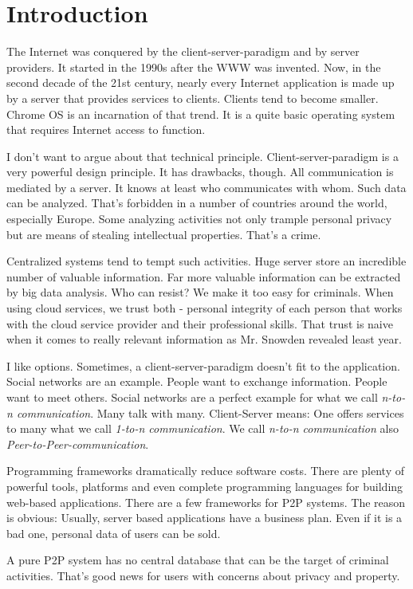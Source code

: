 \chapter{Introduction}
The Internet was conquered by the client-server-paradigm and by server providers. It started in the 1990s after the WWW was invented. Now, in the second decade of the 21st century, nearly every Internet application is made up by a server that provides services to clients. Clients tend to become smaller. Chrome OS is an incarnation of that trend. It is a quite basic operating system that requires Internet access to function.

I don't want to argue about that technical principle. Client-server-paradigm is a very powerful design principle. It has drawbacks, though. All communication is mediated by a server. It knows at least who communicates with whom. Such data can be analyzed. That's forbidden in a number of countries around the world, especially Europe. Some analyzing activities not only trample personal privacy but are means of stealing intellectual properties. That's a crime.

Centralized systems tend to tempt such activities. Huge server store an incredible number of valuable information. Far more valuable information can be extracted by big data analysis. Who can resist? We make it too easy for criminals. When using cloud services, we trust both - personal integrity of each person that works with the cloud service provider and their professional skills. That trust is naive when it comes to really relevant information as Mr. Snowden revealed least year.

I like options. Sometimes, a client-server-paradigm doesn't fit to the application. Social networks are an example. People want to exchange information. People want to meet others. Social networks are a perfect example for what we call {\it n-to-n communication}. Many talk with many. Client-Server means: One offers services to many what we call {\it 1-to-n communication}.
We call {\it n-to-n communication} also {\it Peer-to-Peer-communication}.

Programming frameworks dramatically reduce software costs. There are plenty of powerful tools, platforms and even complete programming languages for building web-based applications. There are a few frameworks for P2P systems. The reason is obvious: Usually, server based applications have a business plan. Even if it is a bad one, personal data of users can be sold. 

A pure P2P system has no central database that can be the target of criminal activities. That's good news for users with concerns about privacy and property. 

